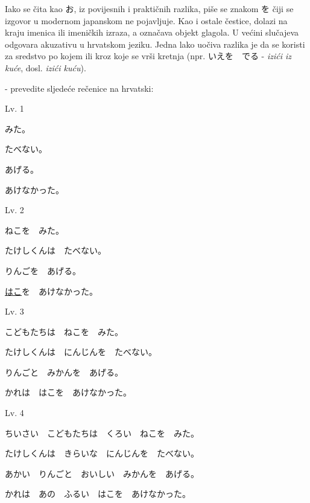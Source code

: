 	Iako se čita kao お, iz povijesnih i praktičnih razlika, piše se znakom を čiji se izgovor u modernom japanskom ne pojavljuje. Kao i ostale čestice, dolazi na kraju imenica ili imeničkih izraza, a označava objekt glagola. U većini slučajeva odgovara akuzativu u hrvatskom jeziku. Jedna lako uočiva razlika je da se koristi za sredstvo po kojem ili kroz koje se vrši kretnja (npr. いえを　でる - \textit{izići iz kuće}, dosl. \textit{izići kuću}).
	
	
	\begin{reibun}
	\end{reibun}

	 - prevedite sljedeće rečenice na hrvatski:
	
	\begin{mondai}{Lv. 1}
		\item みた。
		\item たべない。
		\item あげる。
		\item あけなかった。
	\end{mondai}
	
	\vspace{-10pt}
	\begin{mondai}{Lv. 2}
		\item ねこを　みた。
		\item たけし\footnotemark[3]くんは　たべない。
		\item りんごを　あげる。
		\item \underline{はこ}を　あけなかった。
	\end{mondai}

	\vspace{-10pt}
	\begin{mondai}{Lv. 3}
		\item こどもたちは　ねこを　みた。
		\item たけしくんは　にんじんを　たべない。
		\item りんごと　みかんを　あげる。
		\item かれは　はこを　あけなかった。
	\end{mondai}

	\vspace{-10pt}
	\begin{mondai}{Lv. 4}
		\item ちいさい　こどもたちは　くろい　ねこを　みた。
		\item たけしくんは　きらいな　にんじんを　たべない。
		\item あかい　りんごと　おいしい　みかんを　あげる。
		\item かれは　あの　ふるい　はこを　あけなかった。
	\end{mondai}
	
